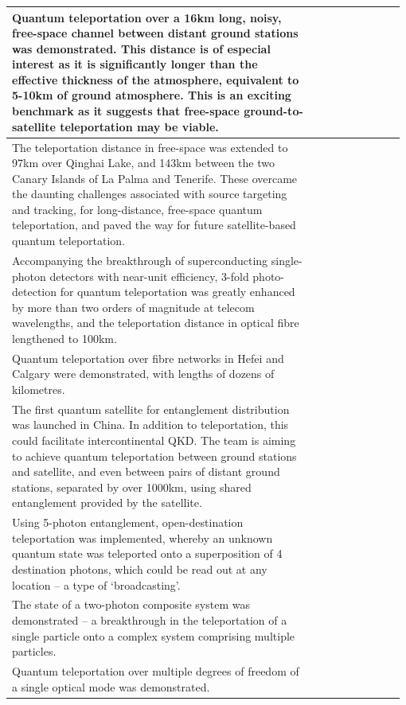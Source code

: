 \documentclass[aps,rmp,twocolumn,amsmath,amssymb,nofootinbib,superscriptaddress,longbibliography,floatfix,table-of-contents,eqsecnum]{revtex4-1}
\begin{document}
\begin{table}[!htb]
\begin{tabular}{|p{0.755\linewidth}|p{0.22\linewidth}|}
	\hline
	Quantum teleportation over a 16km long, noisy, free-space channel between distant ground stations was demonstrated. This distance is of especial interest as it is significantly longer than the effective thickness of the atmosphere, equivalent to 5-10km of ground atmosphere. This is an exciting benchmark as it suggests that free-space ground-to-satellite teleportation may be viable. & \cite{bib:Nat_Phot_4_376, bib:PRL_94_150501} \\
	\hline
	The teleportation distance in free-space was extended to 97km over Qinghai Lake, and 143km between the two Canary Islands of La Palma and Tenerife. These overcame the daunting challenges associated with source targeting and tracking, for long-distance, free-space quantum teleportation, and paved the way for future satellite-based quantum teleportation. & \cite{bib:Nat_488_185, bib:Nat_489_269} \\
	\hline
	Accompanying the breakthrough of superconducting single-photon detectors with near-unit efficiency, 3-fold photo-detection for quantum teleportation was greatly enhanced by more than two orders of magnitude at telecom wavelengths, and the teleportation distance in optical fibre lengthened to 100km. & \cite{bib:Optica_2_832} \\
	\hline
	Quantum teleportation over fibre networks in Hefei and Calgary were demonstrated, with lengths of dozens of kilometres. & \cite{bib:Nat_Phot_10_671, bib:Nat_Phot_10_676} \\
	\hline
	The first quantum satellite for entanglement distribution was launched in China. In addition to teleportation, this could facilitate intercontinental QKD. The team is aiming to achieve quantum teleportation between ground stations and satellite, and even between pairs of distant ground stations, separated by over 1000km, using shared entanglement provided by the satellite. & \cite{bib:Nat_535_478} \\
	\hline
	Using 5-photon entanglement, open-destination teleportation was implemented, whereby an unknown quantum state was teleported onto a superposition of 4 destination photons, which could be read out at any location -- a type of `broadcasting'. & \cite{bib:Nat_430_54} \\
	\hline
	The state of a two-photon composite system was demonstrated -- a breakthrough in the teleportation of a single particle onto a complex system comprising multiple particles. & \cite{bib:Nat_Phys_2_678} \\
	\hline
	Quantum teleportation over multiple degrees of freedom of a single optical mode was demonstrated. & \cite{bib:Nat_518_516} \\

\end{tabular}
\end{table}
\end{document}

